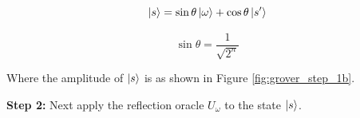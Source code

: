 \documentclass{article}
\begin{document}
\begin{equation}
\ket{s} = \sin\theta\ket{\omega} + \cos\theta\ket{s'}   
\end{equation}
\vspace{5mm}

\begin{equation}
\sin\theta = \frac{1}{\sqrt{2^n}}    
\end{equation}
\vspace{5mm}

Where the amplitude of $\ket{s}$ is as shown in Figure \ref{fig:grover_step_1b}.
\pagebreak

\textbf{Step 2:}
\vspace{5mm}
Next apply the reflection oracle $U_\omega$ to the state $\ket{s}$.
\vspace{5mm}
\end{document}
